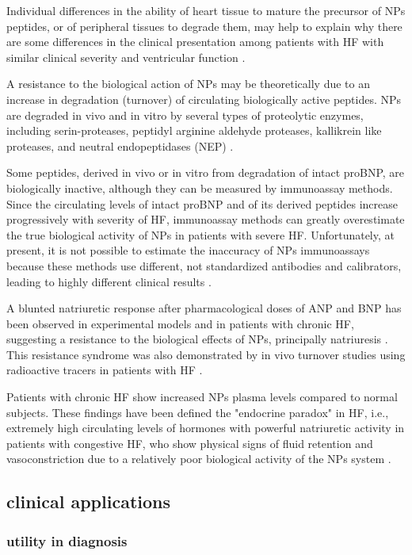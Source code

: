 \documentclass[14pt,a4paper,onecolumn]{extarticle}
\begin{document}
Individual differences in the ability of heart tissue to mature the precursor of NPs peptides, or of peripheral tissues to degrade them, may help to explain why there are some differences in the clinical presentation among patients with HF with similar clinical severity and ventricular function \citep{bib36}. %

A resistance to the biological action of NPs may be theoretically due to an increase in degradation (turnover) of circulating biologically active peptides. NPs are degraded in vivo and in vitro by several types of proteolytic enzymes, including serin-proteases, peptidyl arginine aldehyde proteases, kallikrein like proteases, and neutral endopeptidases (NEP) \citep{bib335}. %

Some peptides, derived in vivo or in vitro from degradation of intact proBNP, are biologically inactive, although they can be measured by immunoassay methods. Since the circulating levels of intact proBNP and of its derived peptides increase progressively with severity of HF, immunoassay methods can greatly overestimate the true biological activity of NPs in patients with severe HF. Unfortunately, at present, it is not possible to estimate the inaccuracy of NPs immunoassays because these methods use different, not standardized antibodies and calibrators, leading to highly different clinical results \citep{bib36}. %

A blunted natriuretic response after pharmacological doses of ANP and BNP has been observed in experimental models and in patients with chronic HF, suggesting a resistance to the biological effects of NPs, principally natriuresis \citep{bib325} \citep{bib333} \citep{bib331}. This resistance syndrome was also demonstrated by in vivo turnover studies using radioactive tracers in patients with HF \citep{bib333}. %

Patients with chronic HF show increased NPs plasma levels compared to normal subjects. These findings have been defined the "endocrine paradox" in HF, i.e., extremely high circulating levels of hormones with powerful natriuretic activity in patients with congestive HF, who show physical signs of fluid retention and vasoconstriction due to a relatively poor biological activity of the NPs system \citep{bib36}. %


\subsection{clinical applications}
\subsubsection{utility in diagnosis}
\end{document}
